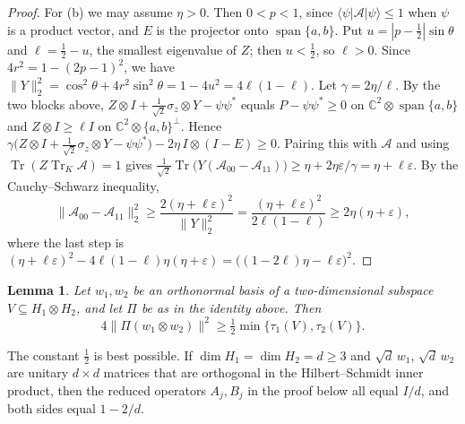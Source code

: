 \documentclass[11pt]{article}
\newtheorem{lemma}[theorem]{Lemma}
\theoremstyle{remark}
\newcommand{\Tr}{\operatorname{Tr}}
\newcommand{\norm}[1]{\lVert #1\rVert}
\begin{document}
\begin{proof}
For (b) we may assume $\eta>0$. Then $0<p<1$, since $\langle\psi|\mathcal A|\psi\rangle\le1$ when $\psi$ is a product
vector, and $E$ is the projector onto $\operatorname{span}\{a,b\}$. Put $u=|p-\frac12|\sin\theta$ and $\ell=\frac12-u$,
the smallest eigenvalue of $Z$; then $u<\frac12$, so $\ell>0$. Since $4r^2=1-(2p-1)^2$, we have
$\norm{Y}_2^2=\cos^2\theta+4r^2\sin^2\theta=1-4u^2=4\ell(1-\ell)$. Let $\gamma=2\eta/\ell$. By the two blocks above,
$Z\otimes I+\frac1{\sqrt2}\sigma_z\otimes Y-\psi\psi^*$ equals $P-\psi\psi^*\ge0$ on
$\mathbb C^2\otimes\operatorname{span}\{a,b\}$ and $Z\otimes I\ge\ell I$ on $\mathbb C^2\otimes\{a,b\}^\perp$. Hence
$\gamma\big(Z\otimes I+\frac1{\sqrt2}\sigma_z\otimes Y-\psi\psi^*\big)-2\eta\,I\otimes(I-E)\ge0$. Pairing this with
$\mathcal A$ and using $\Tr(Z\Tr_K\mathcal A)=1$ gives
$\frac1{\sqrt2}\Tr\big(Y(\mathcal A_{00}-\mathcal A_{11})\big)\ge\eta+2\eta\varepsilon/\gamma=\eta+\ell\varepsilon$. By the
Cauchy--Schwarz inequality,
\[
\norm{\mathcal A_{00}-\mathcal A_{11}}_2^2\ge\frac{2(\eta+\ell\varepsilon)^2}{\norm{Y}_2^2}
=\frac{(\eta+\ell\varepsilon)^2}{2\ell(1-\ell)}\ge2\eta(\eta+\varepsilon),
\]
where the last step is $(\eta+\ell\varepsilon)^2-4\ell(1-\ell)\eta(\eta+\varepsilon)=\big((1-2\ell)\eta-\ell\varepsilon\big)^2$.
\end{proof}

\begin{lemma}\label{lem:pair}
Let $w_1,w_2$ be an orthonormal basis of a two-dimensional subspace $V\subseteq H_1\otimes H_2$, and let $\Pi$ be as in
the identity above. Then
\[
4\norm{\Pi(w_1\otimes w_2)}^2\ge\tfrac12\min\{\tau_1(V),\tau_2(V)\}.
\]
\end{lemma}

The constant $\frac12$ is best possible. If $\dim H_1=\dim H_2=d\ge3$ and $\sqrt d\,w_1$, $\sqrt d\,w_2$ are unitary
$d\times d$ matrices that are orthogonal in the Hilbert--Schmidt inner product, then the reduced operators $A_j,B_j$ in
the proof below all equal $I/d$, and both sides equal $1-2/d$.
\end{document}
